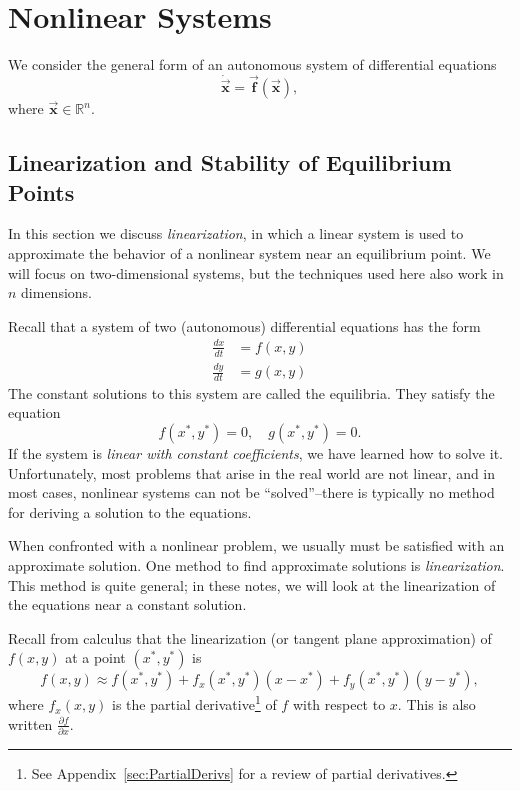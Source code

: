 \documentclass{book}
\newcommand{\Real}{\mathbb{R}}
\newcommand{\BF}{\vec{\textbf{f}}}
\newcommand{\BX}{\vec{\textbf{x}}}
\begin{document}
\section{Nonlinear Systems}
We consider the general form of an autonomous
system of differential equations
\begin{equation}
   \dot{\BX} = \BF\left(\BX\right),
   \label{eqn:NONLIN}
\end{equation}
where $\BX \in \Real^{n}$.
\subsection{Linearization and Stability of Equilibrium Points}
\label{sec:DELinearization}

In this section we discuss \emph{linearization},
in which a linear system
is used to approximate the behavior of a nonlinear system
near an equilibrium point.
We will focus on two-dimensional systems, but the
techniques used here also work in $n$ dimensions.

Recall that a system of two (autonomous) differential equations has the form
\begin{equation}
\begin{split}
  \frac{dx}{dt} & = f(x,y) \\
  \frac{dy}{dt} & = g(x,y)
\end{split}
\label{eqn:de}
\end{equation}
The constant solutions to this system are called the equilibria.
They satisfy the equation
\begin{equation}
    f(x^*,y^*) = 0, \quad g(x^*,y^*) = 0.
\end{equation}
If the system is \emph{linear with constant
coefficients}, we have learned
how to solve it.  Unfortunately, most problems that arise in the
real world are not linear,
and in most cases, nonlinear systems can not be ``solved''--there is
typically no method for deriving a solution to the equations.

When confronted with a nonlinear problem, we usually must
be satisfied with an approximate solution.
One method to find approximate solutions is \emph{linearization}.
This method is quite general; in these notes, we will look at the
linearization of the equations near a constant solution.

Recall from calculus
that the linearization (or tangent plane approximation)
of $f(x,y)$ at a point $(x^*,y^*)$ is
\begin{equation}
  f(x,y) \approx f(x^*,y^*)+f_x(x^*,y^*)(x-x^*) + f_y(x^*,y^*)(y-y^*),
\end{equation}
where $f_x(x,y)$ is the partial derivative\footnote{%
See Appendix~\ref{sec:PartialDerivs} for a review
of partial derivatives.}
of $f$ with respect to $x$.
This is also written $\frac{\partial f}{\partial x}$.
\end{document}
